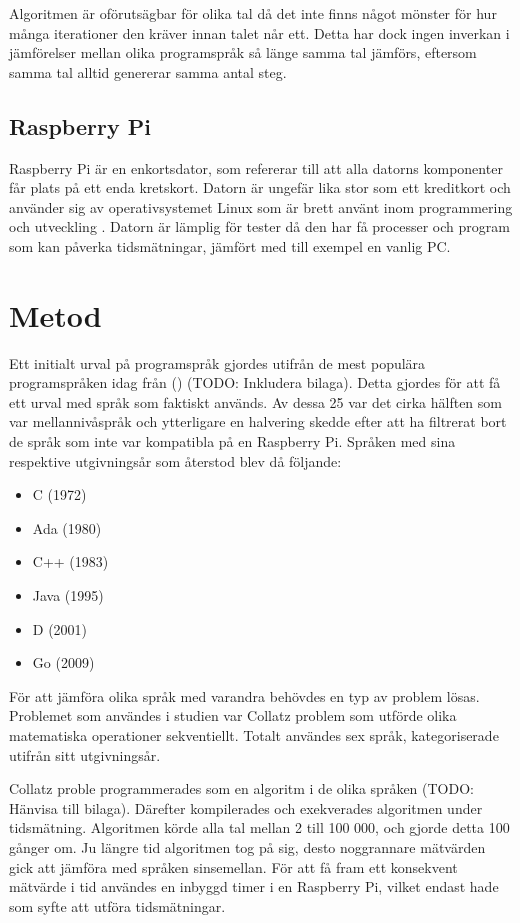 \documentclass[12pt,swedish]{article}
\begin{document}
Algoritmen är oförutsägbar för olika tal då det inte finns något mönster för hur många iterationer den kräver innan talet når ett. Detta har dock ingen inverkan i jämförelser mellan olika programspråk så länge samma tal jämförs, eftersom samma tal alltid genererar samma antal steg. 

\subsection{Raspberry Pi}
Raspberry Pi är en enkortsdator, som refererar till att alla datorns komponenter får plats på ett enda kretskort. Datorn är ungefär lika stor som ett kreditkort och använder sig av operativsystemet Linux som är brett använt inom programmering och utveckling \citep{andrews_2013}. Datorn är lämplig för tester då den har få processer och program som kan påverka tidsmätningar, jämfört med till exempel en vanlig PC.


\newpage
\section{Metod}
Ett initialt urval på programspråk gjordes utifrån de mest populära programspråken idag från \citeauthor{tiobe} (\citeyear{tiobe}) (TODO: Inkludera bilaga). Detta gjordes för att få ett urval med språk som faktiskt används. Av dessa 25 var det cirka hälften som var mellannivåspråk och ytterligare en halvering skedde efter att ha filtrerat bort de språk som inte var kompatibla på en Raspberry Pi. Språken med sina respektive utgivningsår som återstod blev då följande:

\begin{itemize}
    \item C (1972)
    \item Ada (1980)
    \item C++ (1983)
    \item Java (1995)
    \item D (2001)
    \item Go (2009)
\end{itemize}
För att jämföra olika språk med varandra behövdes en typ av problem lösas. Problemet som användes i studien var Collatz problem som utförde olika matematiska operationer sekventiellt. Totalt användes sex språk, kategoriserade utifrån sitt utgivningsår.

Collatz proble programmerades som en algoritm i de olika språken (TODO: Hänvisa till bilaga).
Därefter kompilerades och exekverades algoritmen under tidsmätning. Algoritmen körde alla tal mellan 2 till 100 000, och gjorde detta 100 gånger om. Ju längre tid algoritmen tog på sig, desto noggrannare mätvärden gick att jämföra med språken sinsemellan. För att få fram ett konsekvent mätvärde i tid användes en inbyggd timer i en Raspberry Pi, vilket endast hade som syfte att utföra tidsmätningar.
\end{document}

